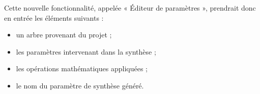 \documentclass[a4paper]{article}
\begin{document}
    Cette nouvelle fonctionnalité, appelée « Éditeur de paramètres », prendrait donc en entrée les éléments suivants :
    \begin{itemize}[label=,font=\color{magenta},parsep=0cm,itemsep=0cm]
        \item un arbre provenant du projet ;
        \item les paramètres intervenant dans la synthèse ;
        \item les opérations mathématiques appliquées ;
        \item le nom du paramètre de synthèse généré.
    \end{itemize}
\end{document}
